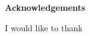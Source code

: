 \thispagestyle{plain}
\begin{center}
	\large
    \textbf{Acknowledgements}
\end{center}
I would like to thank